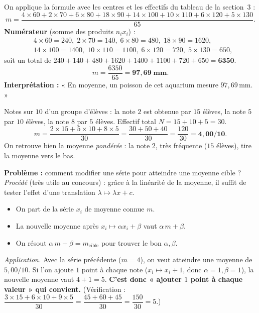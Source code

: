 \documentclass[11pt,a4paper]{article}
\begin{document}
\begin{exemple}
On applique la formule avec les centres et les effectifs du tableau de la section~3 :
\[
m=\dfrac{4\times 60+2\times 70+6\times 80+18\times 90+14\times 100+10\times 110+6\times 120+5\times 130}{65}.
\]
\textbf{Numérateur} (somme des produits $n_i x_i$) :
{\small
\[
\begin{aligned}
&4\times60=240,\;2\times70=140,\;6\times80=480,\;18\times90=1620,\\
&14\times100=1400,\;10\times110=1100,\;6\times120=720,\;5\times130=650,
\end{aligned}
\]}
soit un total de $240+140+480+1620+1400+1100+720+650=\mathbf{6350}$.
\[
m=\dfrac{6350}{65}=\mathbf{97{,}69\;\text{mm}}.
\]
\textbf{Interprétation :} « En moyenne, un poisson de cet aquarium mesure $97{,}69$\,mm. »
\end{exemple}

\begin{exemple}
Notes sur $10$ d'un groupe d'élèves : la note $2$ est obtenue par $15$ élèves, la note $5$ par $10$
élèves, la note $8$ par $5$ élèves. Effectif total $N=15+10+5=30$.
\[
m=\dfrac{2\times 15+5\times 10+8\times 5}{30}
  =\dfrac{30+50+40}{30}=\dfrac{120}{30}=\mathbf{4{,}00/10}.
\]
On retrouve bien la moyenne \emph{pondérée} : la note $2$, très fréquente ($15$ élèves), tire la
moyenne vers le bas.
\end{exemple}

\begin{commentfaire}
\textbf{Problème :} comment modifier une série pour atteindre une moyenne cible ?
\emph{Procédé} (très utile au concours) : grâce à la linéarité de la moyenne, il suffit de tester
l'effet d'une translation $\lambda\mapsto \lambda x + c$.
\begin{itemize}[leftmargin=1.6em,topsep=2pt,itemsep=1pt]
  \item On part de la série $x_i$ de moyenne connue $m$.
  \item La nouvelle moyenne après $x_i\mapsto \alpha x_i+\beta$ vaut $\alpha\,m+\beta$.
  \item On résout $\alpha\,m+\beta=m_{\text{cible}}$ pour trouver le bon $\alpha,\beta$.
\end{itemize}
\emph{Application.} Avec la série précédente ($m=4$), on veut atteindre une moyenne de $5{,}00/10$.
Si l'on ajoute $1$ point à chaque note ($x_i\mapsto x_i+1$, donc $\alpha=1,\beta=1$), la nouvelle
moyenne vaut $4+1=5$. \textbf{C'est donc « ajouter $1$ point à chaque valeur » qui convient.}
(Vérification : $\dfrac{3\times15+6\times10+9\times5}{30}=\dfrac{45+60+45}{30}=\dfrac{150}{30}=5$.)
\end{commentfaire}
\end{document}
